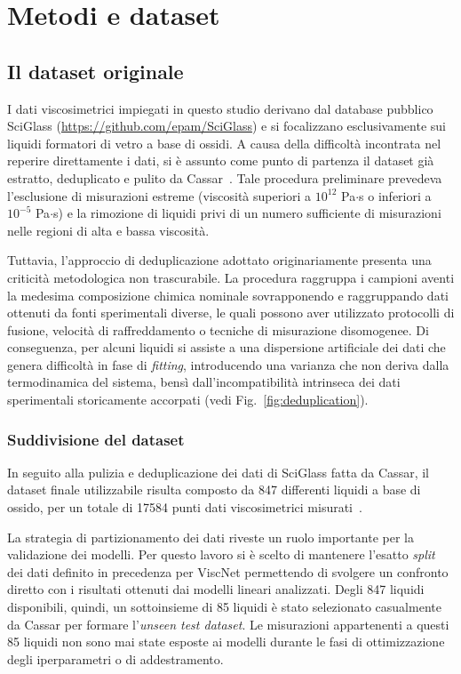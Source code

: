 \documentclass[../main.tex]{subfiles}
\begin{document}
	
	\chapter{Metodi e dataset}
	\label{ch:metodi_dataset}
	
	\section{Il dataset originale}
	\label{sec:dataset_originale}
	I dati viscosimetrici impiegati in questo studio derivano dal database pubblico SciGlass (\url{https://github.com/epam/SciGlass}) e si focalizzano esclusivamente sui liquidi formatori di vetro a base di ossidi. A causa della difficoltà incontrata nel reperire direttamente i dati, si è assunto come punto di partenza il dataset già estratto, deduplicato e pulito da Cassar~\cite{cassarViscNetNeuralNetwork2021}. Tale procedura preliminare prevedeva l'esclusione di misurazioni estreme (viscosità superiori a $10^{12}$ Pa$\cdot$s o inferiori a $10^{-5}$ Pa$\cdot$s) e la rimozione di liquidi privi di un numero sufficiente di misurazioni nelle regioni di alta e bassa viscosità.
	
	Tuttavia, l'approccio di deduplicazione adottato originariamente presenta una criticità metodologica non trascurabile. La procedura raggruppa i campioni aventi la medesima composizione chimica nominale sovrapponendo e raggruppando dati ottenuti da fonti sperimentali diverse, le quali possono aver utilizzato protocolli di fusione, velocità di raffreddamento o tecniche di misurazione disomogenee. Di conseguenza, per alcuni liquidi si assiste a una dispersione artificiale dei dati che genera difficoltà in fase di \textit{fitting}, introducendo una varianza che non deriva dalla termodinamica del sistema, bensì dall'incompatibilità intrinseca dei dati sperimentali storicamente accorpati (vedi Fig.~\ref{fig:deduplication}).
	
	\subsection*{Suddivisione del dataset}
	\label{sec:data_split}
	In seguito alla pulizia e deduplicazione dei dati di SciGlass fatta da Cassar, il dataset finale utilizzabile risulta composto da 847 differenti liquidi a base di ossido, per un totale di 17584 punti dati viscosimetrici misurati~\cite{cassarViscNetNeuralNetwork2021}. 
	
	La strategia di partizionamento dei dati riveste un ruolo importante per la validazione dei modelli. Per questo lavoro si è scelto di mantenere l'esatto \textit{split} dei dati definito in precedenza per ViscNet permettendo di svolgere un confronto diretto con i risultati ottenuti dai modelli lineari analizzati. Degli 847 liquidi disponibili, quindi, un sottoinsieme di 85 liquidi è stato selezionato casualmente da Cassar per formare l'\textit{unseen test dataset}. Le misurazioni appartenenti a questi 85 liquidi non sono mai state esposte ai modelli durante le fasi di ottimizzazione degli iperparametri o di addestramento.
	
\end{document}

